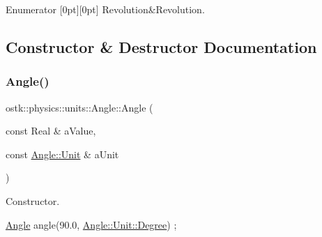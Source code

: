 \begin{DoxyEnumFields}{Enumerator}
[0pt][0pt]{}\mbox{\label{classostk_1_1physics_1_1units_1_1_angle_aea1f8018b1d378b9dee56959d8eb9defaad09b2d48b2811c68e5a2bf421f7f2f2}} 
Revolution&Revolution. \\
\hline

\end{DoxyEnumFields}


\subsection{Constructor \& Destructor Documentation}
\mbox{\label{classostk_1_1physics_1_1units_1_1_angle_a4892c7a7ed48adabf5c942dbda7ad848}} 
\subsubsection{\texorpdfstring{Angle()}{Angle()}\hspace{0.1cm}{\footnotesize\ttfamily [1/2]}}
{\footnotesize\ttfamily ostk\+::physics\+::units\+::\+Angle\+::\+Angle (\begin{DoxyParamCaption}\item[{const Real \&}]{a\+Value,  }\item[{const \hyperlink{classostk_1_1physics_1_1units_1_1_angle_aea1f8018b1d378b9dee56959d8eb9def}{Angle\+::\+Unit} \&}]{a\+Unit }\end{DoxyParamCaption})}



Constructor. 


\begin{DoxyCode}
\hyperlink{classostk_1_1physics_1_1units_1_1_angle_a4892c7a7ed48adabf5c942dbda7ad848}{Angle} angle(90.0, \hyperlink{classostk_1_1physics_1_1units_1_1_angle_aea1f8018b1d378b9dee56959d8eb9defa6669c4dc00cb161446821b3529ca07d8}{Angle::Unit::Degree}) ;
\end{DoxyCode}



